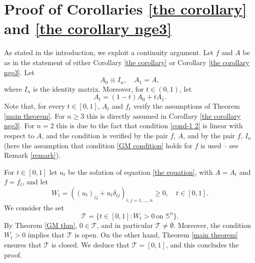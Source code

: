 \documentclass[12pt]{amsart}
\newcommand{\1}{\mathbf 1}
\newcommand{\sfe}{{{\mathbb S}^{n}}}
\begin{document}
\section{Proof of Corollaries \ref{the corollary} and \ref{the corollary nge3}}\label{final section}
As stated in the introduction, we exploit a continuity argument. Let $f$ and $A$ be as in the statement of either Corollary \ref{the corollary} or Corollary \ref{the corollary nge3}. Let
$$
A_0\equiv I_n,\quad A_1=A,
$$ 
where $I_n$ is the identity matrix. Moreover, for $t\in(0,1)$, let
$$
A_t=(1-t)A_0+tA_1.
$$
Note that, for every $t\in[0,1]$, $A_t$ and $f_t$ verify the assumptions of Theorem \ref{main theorem}. For $n\ge3$ this is directly assumed in Corollary \ref{the corollary nge3}. For $n=2$ this is due to the fact that condition \eqref{cond-1 2} is linear with respect to $A$, and the condition is verified by the pair $f$, $A$, and by the pair $f$, $I_n$ (here the assumption that condition \eqref{GM condition} holds for $f$ is used -- see Remark \ref{remark}). 

For $t\in[0,1]$ let $u_t$ be the solution of equation \eqref{the equation}, with $A=A_t$ and $f=f_t$, and let 
\[
W_t=((u_t)_{ij}+u_t\delta_{ij})_{i,j=1,\dots,n}\ge 0,\quad t\in[0,1].
\] 
We consider the set
$$
{\mathcal T}=\{t\in[0,1]\colon W_t>0\,\mbox{on $\sfe$}\}.
$$
By Theorem \ref{GM thm}, $0\in{\mathcal T}$, and in particular $\mathcal T\ne\emptyset$. Moreover, the condition $W_t>0$ implies that  $\mathcal T$ is open. On the other hand, Theorem \ref{main theorem} ensures that $\mathcal T$ is closed. We deduce that ${\mathcal T}=[0,1]$, and this concludes the proof.
\end{document}
